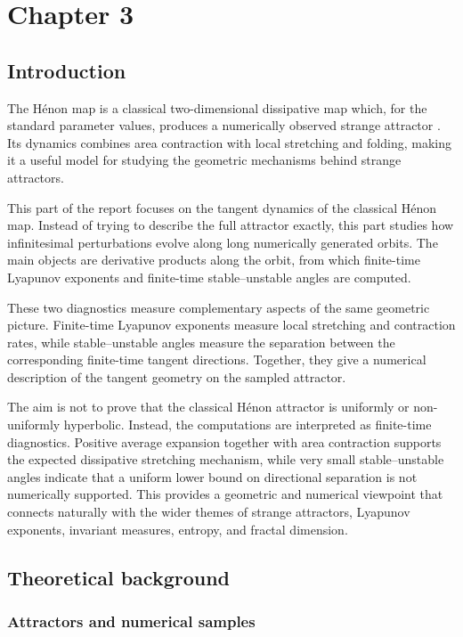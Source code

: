 \section{ Chapter 3}
\subsection{Introduction}

The Hénon map is a classical two-dimensional dissipative map which, for the standard parameter values, produces a numerically observed strange attractor \cite{Henon1976}. Its dynamics combines area contraction with local stretching and folding, making it a useful model for studying the geometric mechanisms behind strange attractors.

This part of the report focuses on the tangent dynamics of the classical Hénon map. Instead of trying to describe the full attractor exactly, this part studies how infinitesimal perturbations evolve along long numerically generated orbits. The main objects are derivative products along the orbit, from which finite-time Lyapunov exponents and finite-time stable--unstable angles are computed.

These two diagnostics measure complementary aspects of the same geometric picture. Finite-time Lyapunov exponents measure local stretching and contraction rates, while stable--unstable angles measure the separation between the corresponding finite-time tangent directions. Together, they give a numerical description of the tangent geometry on the sampled attractor.

The aim is not to prove that the classical Hénon attractor is uniformly or non-uniformly hyperbolic. Instead, the computations are interpreted as finite-time diagnostics. Positive average expansion together with area contraction supports the expected dissipative stretching mechanism, while very small stable--unstable angles indicate that a uniform lower bound on directional separation is not numerically supported. This provides a geometric and numerical viewpoint that connects naturally with the wider themes of strange attractors, Lyapunov exponents, invariant measures, entropy, and fractal dimension.

\subsection{Theoretical background}
\label{sec:theoretical-model}


\subsubsection{Attractors and numerical samples}
\label{subsec:invariant-sets}

